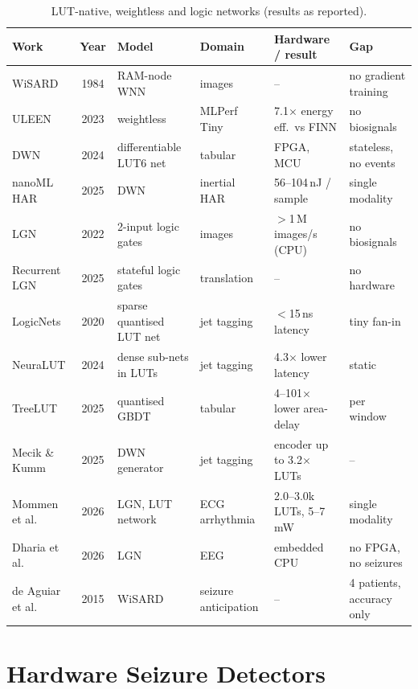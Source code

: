 \begin{table}[htbp]
\centering\small
\caption{LUT-native, weightless and logic networks (results as reported).}\label{tab:lit-lut}
\begin{tabularx}{\textwidth}{@{}P{30mm}cP{27mm}P{22mm}LL@{}}
\toprule
\textbf{Work} & \textbf{Year} & \textbf{Model} & \textbf{Domain} & \textbf{Hardware / result} & \textbf{Gap}\\
\midrule
WiSARD \cite{aleksander1984wisard} & 1984 & RAM-node WNN & images & -- & no gradient training\\
ULEEN \cite{susskind2023uleen} & 2023 & weightless & MLPerf Tiny & 7.1$\times$ energy eff.\ vs FINN & no biosignals\\
DWN \cite{bacellar2024dwn} & 2024 & differentiable LUT6 net & tabular & FPGA, MCU & stateless, no events\\
nanoML HAR \cite{bacellar2025nanoml} & 2025 & DWN & inertial HAR & 56--104\,nJ / sample & single modality\\
LGN \cite{petersen2022dlgn} & 2022 & 2-input logic gates & images & $>$1\,M images/s (CPU) & no biosignals\\
Recurrent LGN \cite{buhrer2025rdlgn} & 2025 & stateful logic gates & translation & -- & no hardware\\
LogicNets \cite{umuroglu2020logicnets} & 2020 & sparse quantised LUT net & jet tagging & $<$15\,ns latency & tiny fan-in\\
NeuraLUT \cite{andronic2024neuralut} & 2024 & dense sub-nets in LUTs & jet tagging & 4.3$\times$ lower latency & static\\
TreeLUT \cite{khataei2025treelut} & 2025 & quantised GBDT & tabular & 4--101$\times$ lower area-delay & per window\\
Mecik \& Kumm \cite{mecik2025thermo} & 2025 & DWN generator & jet tagging & encoder up to 3.2$\times$ LUTs & --\\
Mommen et al. \cite{mommen2026ecg} & 2026 & LGN, LUT network & ECG arrhythmia & 2.0--3.0k LUTs, 5--7\,mW & single modality\\
Dharia et al. \cite{dharia2026eeglgn} & 2026 & LGN & EEG & embedded CPU & no FPGA, no seizures\\
de Aguiar et al. \cite{deaguiar2015wisard} & 2015 & WiSARD & seizure anticipation & -- & 4 patients, accuracy only\\
\bottomrule
\end{tabularx}
\end{table}

\section{Hardware Seizure Detectors}\label{sec:lit-hw}

